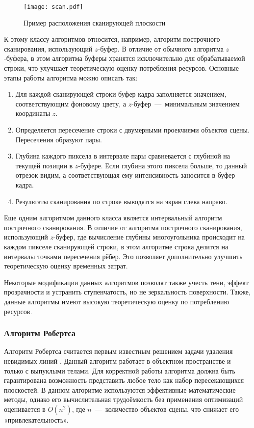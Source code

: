 \begin{figure}[h!]
    \centering
    \texttt{[image: scan.pdf]}
    \caption{Пример расположения сканирующей плоскости}
    \label{img:scan}
\end{figure}

К этому классу алгоритмов относится, например, алгоритм построчного сканирования, использующий $z$-буфер. В отличие от обычного алгоритма $z$-буфера, в этом алгоритма буферы хранятся исключительно для обрабатываемой строки, что улучшает теоретическую оценку потребления ресурсов. Основные этапы работы алгоритма можно описать так:
\begin{enumerate}[label={\arabic*)}]
	\item Для каждой сканирующей строки буфер кадра заполняется значением, соответствующим фоновому цвету, а $z$-буфер~---~минимальным значением координаты $z$.
	\item Определяется пересечение строки с двумерными проекчиями объектов сцены. Пересечения образуют пары.
	\item Глубина каждого пиксела в интервале пары сравневается с глубиной на текущей позиции в $z$-буфере. Если глубина этого пиксела больше, то данный отрезок видим, а соответствующая ему интенсивность заносится в буфер кадра.
	\item Результаты сканирования по строке выводятся на экран слева направо.
\end{enumerate}

Еще одним алгоритмом данного класса является интервальный алгоритм построчного сканирования. В отличие от алгоритма построчного сканирования, использующий $z$-буфер, где вычисление глубины многоугольника происходит на каждом пикселе сканирующей строки, в этом алгоритме строка делится на интервалы точками пересечения рёбер. Это позволяет дополнительно улучшить теоретическую оценку временных затрат.

Некоторые модификации данных алгоритмов позволят также учесть тени, эффект прозрачности и устранить ступенчатость, но не зеркальность поверхности. Также, данные алгоритмы имеют высокую теоретическую оценку по потреблению ресурсов.

\subsubsection{Алгоритм Робертса}
Алгоритм Робертса считается первым известным решением задачи удаления невидимых линий \cite{item12}. Данный алгоритм работает в объектном пространстве и только с выпуклыми телами. Для корректной работы алгоритма должна быть гарантирована возможность представить любое тело как набор пересекающихся плоскостей. В данном алгоритме используются эффективные математические методы, однако его вычислительная трудоёмкость без применения оптимизаций оценивается в $O(n^2)$, где $n$~---~количество объектов сцены, что снижает его «привлекательность». 

